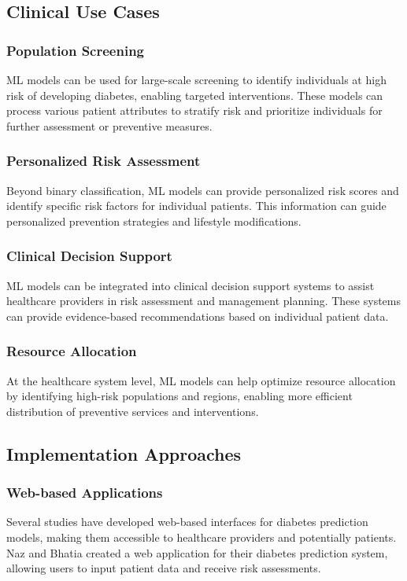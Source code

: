 \documentclass[journal]{IEEEtran}
\begin{document}
\subsection{Clinical Use Cases}
\subsubsection{Population Screening}
ML models can be used for large-scale screening to identify individuals at high risk of developing diabetes, enabling targeted interventions. These models can process various patient attributes to stratify risk and prioritize individuals for further assessment or preventive measures.

\subsubsection{Personalized Risk Assessment}
Beyond binary classification, ML models can provide personalized risk scores and identify specific risk factors for individual patients. This information can guide personalized prevention strategies and lifestyle modifications.

\subsubsection{Clinical Decision Support}
ML models can be integrated into clinical decision support systems to assist healthcare providers in risk assessment and management planning. These systems can provide evidence-based recommendations based on individual patient data.

\subsubsection{Resource Allocation}
At the healthcare system level, ML models can help optimize resource allocation by identifying high-risk populations and regions, enabling more efficient distribution of preventive services and interventions.

\subsection{Implementation Approaches}
\subsubsection{Web-based Applications}
Several studies have developed web-based interfaces for diabetes prediction models, making them accessible to healthcare providers and potentially patients. Naz and Bhatia \cite{naz2023} created a web application for their diabetes prediction system, allowing users to input patient data and receive risk assessments.
\end{document}
